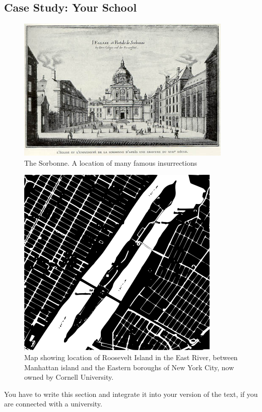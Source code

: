 \subsection{Case Study: Your School}\label{case-study-your-school}

\begin{figure}[htbp]
\centering
\includegraphics{images/Sorbonne.png}
\caption{The Sorbonne. A location of many famous insurrections}
\end{figure}

\begin{figure}[htbp]
\centering
\includegraphics{images/roosevelt.png}
\caption{Map showing location of Roosevelt Island in the East River,
between Manhattan island and the Eastern boroughs of New York City, now
owned by Cornell University.}
\end{figure}

You have to write this section and integrate it into your version of the
text, if you are connected with a university.

